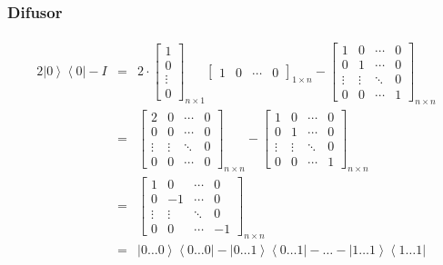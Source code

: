 \subsubsection{Difusor}\label{subsubsec:difusor}

\[\begin{aligned}
\begin{matrix}
2 \left| 0 \right\rangle \left\langle 0 \right| - I &=& 2 \cdot
\begin{bmatrix}
1       \\
0       \\
\vdots  \\
0
\end{bmatrix}_{n \times 1}
\begin{bmatrix}
1 & 0 & \cdots & 0
\end{bmatrix}_{1 \times n} -
\begin{bmatrix}
1 & 0 & \cdots & 0 \\
0 & 1 & \cdots & 0 \\
\vdots & \vdots & \ddots & 0 \\
0 & 0 & \cdots & 1
\end{bmatrix}_{n \times n}
\\
&=&
\begin{bmatrix}
2 & 0 & \cdots & 0 \\
0 & 0 & \cdots & 0 \\
\vdots & \vdots & \ddots & 0 \\
0 & 0 & \cdots & 0
\end{bmatrix}_{n \times n} -
\begin{bmatrix}
1 & 0 & \cdots & 0 \\
0 & 1 & \cdots & 0 \\
\vdots & \vdots & \ddots & 0 \\
0 & 0 & \cdots & 1
\end{bmatrix}_{n \times n}
\\
&=&
\begin{bmatrix}
1 & 0 & \cdots & 0\\
0 & -1 & \cdots & 0 \\
\vdots & \vdots & \ddots & 0 \\
0 & 0 & \cdots & -1
\end{bmatrix}_{n \times n}
\\
&=& \left| 0\dots 0 \right\rangle \left\langle 0 \dots 0 \right| - \left| 0 \dots 1 \right\rangle \left\langle 0 \dots 1 \right| -\dots - \left| 1 \dots 1\right\rangle \left\langle 1 \dots 1 \right|
\end{matrix}
\end{aligned}\]

